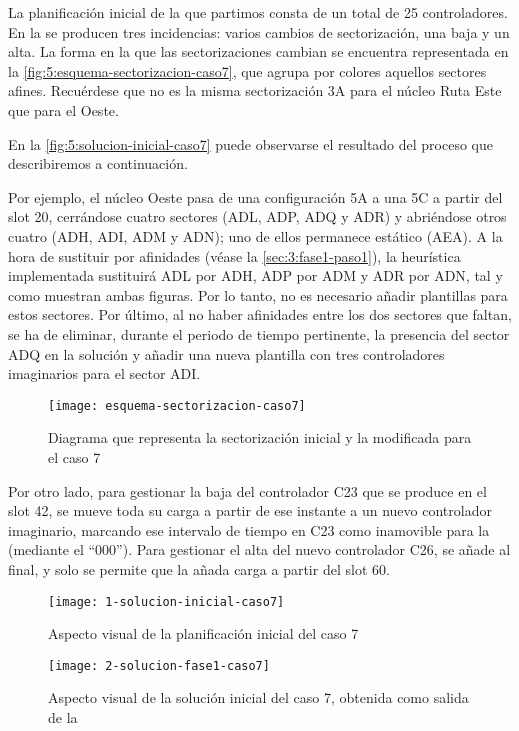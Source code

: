 La planificación inicial de la que partimos consta de un total de 25 controladores. 
En la \faseuno{} se producen tres incidencias: varios cambios de sectorización, una baja y un alta.
La forma en la que las sectorizaciones cambian se encuentra representada en la \autoref{fig:5:esquema-sectorizacion-caso7}, que agrupa por colores aquellos sectores afines. 
Recuérdese que no es la misma sectorización 3A para el núcleo Ruta Este que para el Oeste. 

En la \autoref{fig:5:solucion-inicial-caso7} puede observarse el resultado del proceso que describiremos a continuación.

Por ejemplo, el núcleo Oeste pasa de una configuración 5A a una 5C a partir del slot 20, cerrándose cuatro sectores (ADL, ADP, ADQ y ADR) y abriéndose otros cuatro (ADH, ADI, ADM y ADN); uno de ellos permanece estático (AEA). 
A la hora de sustituir por afinidades (véase la \autoref{sec:3:fase1-paso1}), la heurística implementada sustituirá ADL por ADH, ADP por ADM y ADR por ADN, tal y como muestran ambas figuras. Por lo tanto, no es necesario añadir plantillas para estos sectores. Por último, al no haber afinidades entre los dos sectores que faltan, se ha de eliminar, durante el periodo de tiempo pertinente, la presencia del sector ADQ en la solución y añadir una nueva plantilla con tres controladores imaginarios para el sector ADI.

\begin{figure}
	\centering
	\texttt{[image: esquema-sectorizacion-caso7]}
	\caption{Diagrama que representa la sectorización inicial y la modificada para el caso 7}
	\label{fig:5:esquema-sectorizacion-caso7}
\end{figure}

Por otro lado, para gestionar la baja del controlador C23 que se produce en el slot 42, se mueve toda su carga a partir de ese instante a un nuevo controlador imaginario, marcando ese intervalo de tiempo en C23 como inamovible para la \fasedos{} (mediante el ``000'').
Para gestionar el alta del nuevo controlador C26, se añade al final, y solo se permite que la \fasedos{} añada carga a partir del slot 60.

\begin{figure}
	\centering
	\texttt{[image: 1-solucion-inicial-caso7]}
	\caption{Aspecto visual de la planificación inicial del caso 7}
	\label{fig:5:solucion-inicial-caso7}
\end{figure}

\begin{figure}
	\centering
	\texttt{[image: 2-solucion-fase1-caso7]}
	\caption{Aspecto visual de la solución inicial del caso 7, obtenida como salida de la \faseuno{}}
	\label{fig:5:solucion-fase1-caso7}
\end{figure}

